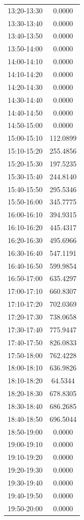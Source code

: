 \begin{longtable}{@{}cc@{}}
13:20-13:30 & 0.0000 \\
13:30-13:40 & 0.0000 \\
13:40-13:50 & 0.0000 \\
13:50-14:00 & 0.0000 \\
14:00-14:10 & 0.0000 \\
14:10-14:20 & 0.0000 \\
14:20-14:30 & 0.0000 \\
14:30-14:40 & 0.0000 \\
14:40-14:50 & 0.0000 \\
14:50-15:00 & 0.0000 \\
15:00-15:10 & 112.0899 \\
15:10-15:20 & 255.4856 \\
15:20-15:30 & 197.5235 \\
15:30-15:40 & 244.8140 \\
15:40-15:50 & 295.5346 \\
15:50-16:00 & 345.7775 \\
16:00-16:10 & 394.9315 \\
16:10-16:20 & 445.4317 \\
16:20-16:30 & 495.6966 \\
16:30-16:40 & 547.1191 \\
16:40-16:50 & 599.9854 \\
16:50-17:00 & 635.4297 \\
17:00-17:10 & 660.8307 \\
17:10-17:20 & 702.0369 \\
17:20-17:30 & 738.0658 \\
17:30-17:40 & 775.9447 \\
17:40-17:50 & 826.0833 \\
17:50-18:00 & 762.4228 \\
18:00-18:10 & 636.9826 \\
18:10-18:20 & 64.5344 \\
18:20-18:30 & 678.8305 \\
18:30-18:40 & 686.2685 \\
18:40-18:50 & 696.5044 \\
18:50-19:00 & 0.0000 \\
19:00-19:10 & 0.0000 \\
19:10-19:20 & 0.0000 \\
19:20-19:30 & 0.0000 \\
19:30-19:40 & 0.0000 \\
19:40-19:50 & 0.0000 \\
19:50-20:00 & 0.0000 \\

\end{longtable}
